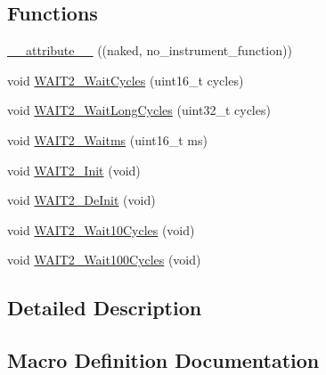 \subsection*{Functions}
\begin{DoxyCompactItemize}
\item 
\hyperlink{group___w_a_i_t2__module_ga0d401ca6ca297b5b7a450deed0c42b78}{\+\_\+\+\_\+attribute\+\_\+\+\_\+} ((naked, no\+\_\+instrument\+\_\+function))
\item 
void \hyperlink{group___w_a_i_t2__module_ga0b3ae724f3fe49461aeb652417583368}{W\+A\+I\+T2\+\_\+\+Wait\+Cycles} (uint16\+\_\+t cycles)
\item 
void \hyperlink{group___w_a_i_t2__module_ga5519763aaeaee6e8b167520411235c92}{W\+A\+I\+T2\+\_\+\+Wait\+Long\+Cycles} (uint32\+\_\+t cycles)
\item 
void \hyperlink{group___w_a_i_t2__module_ga0ca6d6b6223491aaa5fca0ef97ecee27}{W\+A\+I\+T2\+\_\+\+Waitms} (uint16\+\_\+t ms)
\item 
void \hyperlink{group___w_a_i_t2__module_ga02e3940dac9ccd5ffc55a0ea68162a6b}{W\+A\+I\+T2\+\_\+\+Init} (void)
\item 
void \hyperlink{group___w_a_i_t2__module_ga1f7e715f7e7119d3b036a08c1635a3c3}{W\+A\+I\+T2\+\_\+\+De\+Init} (void)
\item 
void \hyperlink{group___w_a_i_t2__module_ga6b9655eaa0aea0b7d727bf57dae98c52}{W\+A\+I\+T2\+\_\+\+Wait10\+Cycles} (void)
\item 
void \hyperlink{group___w_a_i_t2__module_ga545ebe42a76d7f779ab3d58533827638}{W\+A\+I\+T2\+\_\+\+Wait100\+Cycles} (void)
\end{DoxyCompactItemize}


\subsection{Detailed Description}


\subsection{Macro Definition Documentation}
\mbox{\label{group___w_a_i_t2__module_ga42be87062ba4bee82e74182008e6afbc}} 
